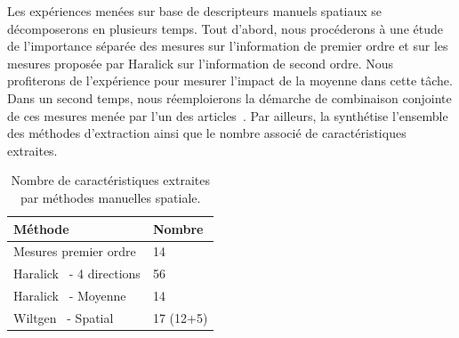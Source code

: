 Les expériences menées sur base de descripteurs manuels spatiaux se décomposerons en plusieurs temps. Tout d'abord, nous procéderons à une étude de l'importance séparée des mesures sur l'information de premier ordre et sur les mesures proposée par Haralick sur l'information de second ordre. Nous profiterons de l'expérience pour mesurer l'impact de la moyenne dans cette tâche. Dans un second temps, nous réemploierons la démarche de combinaison conjointe de ces mesures menée par l'un des articles~\cite{Wiltgen2008}. Par ailleurs, la  synthétise l'ensemble des méthodes d'extraction ainsi que le nombre associé de caractéristiques extraites.\par
\begin{table}[h]
\centering
    \begin{tabular*}{0.6\linewidth}{l@{\extracolsep{\fill}}l}
        \hline
        \textbf{Méthode}                            & \textbf{Nombre}   \\ \hline
        Mesures premier ordre                       & 14                \\ \hline
        Haralick~\cite{Haralick1973} - 4 directions & 56                \\ \hline
        Haralick~\cite{Haralick1973} - Moyenne      & 14                \\ \hline
        Wiltgen~\cite{Wiltgen2008} - Spatial        & 17 (12+5)         \\ \hline
    \end{tabular*}
    \caption{Nombre de caractéristiques extraites par méthodes manuelles spatiale.}
    \label{tab:number_features_spatial}
\end{table}

